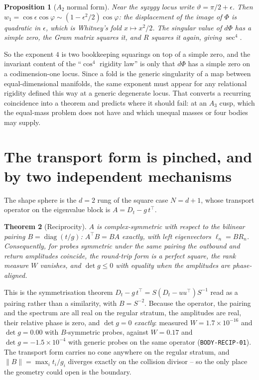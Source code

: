 \documentclass[11pt]{article}
\newtheorem{theorem}{Theorem}
\newtheorem{proposition}[theorem]{Proposition}
\theoremstyle{remark}
\begin{document}
\begin{proposition}[$A_2$ normal form]\label{p:fold}
Near the syzygy locus write $\vartheta=\pi/2+\epsilon$. Then
$w_1=\cos\epsilon\cos\varphi\sim(1-\epsilon^{2}/2)\cos\varphi$: the displacement of the
image of $\Phi$ is quadratic in $\epsilon$, which is Whitney's fold $x\mapsto x^{2}/2$. The
singular value of $d\Phi$ has a simple zero, the Gram matrix squares it, and $R$ squares it
again, giving $\sec^{4}$.
\end{proposition}

\noindent
So the exponent $4$ is two bookkeeping squarings on top of a simple zero, and the invariant
content of the ``$\cos^4$ rigidity law'' is only that $d\Phi$ has a simple zero on a
codimension-one locus. Since a fold is the generic singularity of a map between
equal-dimensional manifolds, the same exponent must appear for any relational rigidity
defined this way at a generic degenerate locus. That converts a recurring coincidence into a
theorem and predicts where it should fail: at an $A_3$ cusp, which the equal-mass problem
does not have and which unequal masses or four bodies may supply.

\section{The transport form is pinched, and by two independent mechanisms}

The shape sphere is the $d=2$ rung of the square case $N=d+1$, whose transport operator on
the eigenvalue block is $A=D_t-g\,t^{\!\top}$.

\begin{theorem}[Reciprocity]\label{t:recip}
$A$ is complex-symmetric with respect to the bilinear pairing
$B=\operatorname{diag}(t/g)$: $A^{\!\top}B=BA$ exactly, with left eigenvectors $\ell_n=BR_n$.
Consequently, for probes symmetric under the same pairing the outbound and return
amplitudes coincide, the round-trip form is a perfect square, the rank measure $W$ vanishes,
and $\det g\le0$ with equality when the amplitudes are phase-aligned.
\end{theorem}

\noindent
This is the symmetrisation theorem $D_t-g\,t^{\!\top}=S(D_t-uu^{\!\top})S^{-1}$ read as a
pairing rather than a similarity, with $B=S^{-2}$. Because the operator, the pairing and the
spectrum are all real on the regular stratum, the amplitudes are real, their relative phase
is zero, and $\det g=0$ \emph{exactly}: measured $W=1.7\times10^{-16}$ and $\det g=0.00$ with
$B$-symmetric probes, against $W=0.17$ and $\det g=-1.5\times10^{-4}$ with generic probes on
the same operator (\texttt{BODY-RECIP-01}). The transport form carries no cone anywhere on
the regular stratum, and $\|B\|=\max_i t_i/g_i$ diverges exactly on the collision divisor --
so the only place the geometry could open is the boundary.
\end{document}
